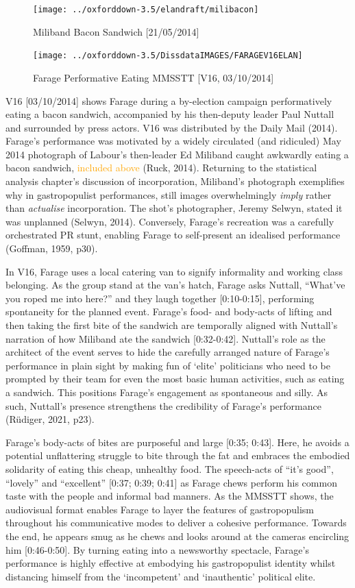 \documentclass[a4paper, nobind]{templates/ociamthesis}
\begin{document}
\begin{figure}
\texttt{[image: ../oxforddown-3.5/elandraft/milibacon]} \caption{Miliband Bacon Sandwich [21/05/2014]}\label{fig:unnamed-chunk-26}
\end{figure}

\begin{figure}
\texttt{[image: ../oxforddown-3.5/DissdataIMAGES/FARAGEV16ELAN]} \caption{Farage Performative Eating MMSSTT [V16, 03/10/2014]}\label{fig:unnamed-chunk-27}
\end{figure}

V16 {[}03/10/2014{]} shows Farage during a by-election campaign performatively eating a bacon sandwich, accompanied by his then-deputy leader Paul Nuttall and surrounded by press actors. V16 was distributed by the Daily Mail (2014). Farage's performance was motivated by a widely circulated (and ridiculed) May 2014 photograph of Labour's then-leader Ed Miliband caught awkwardly eating a bacon sandwich, \textcolor{orange}{included above} (Ruck, 2014). Returning to the statistical analysis chapter's discussion of incorporation, Miliband's photograph exemplifies why in gastropopulist performances, still images overwhelmingly \emph{imply} rather than \emph{actualise} incorporation. The shot's photographer, Jeremy Selwyn, stated it was unplanned (Selwyn, 2014). Conversely, Farage's recreation was a carefully orchestrated PR stunt, enabling Farage to self-present an idealised performance (Goffman, 1959, p30).

In V16, Farage uses a local catering van to signify informality and working class belonging. As the group stand at the van's hatch, Farage asks Nuttall, ``What've you roped me into here?'' and they laugh together {[}0:10-0:15{]}, performing spontaneity for the planned event. Farage's food- and body-acts of lifting and then taking the first bite of the sandwich are temporally aligned with Nuttall's narration of how Miliband ate the sandwich {[}0:32-0:42{]}. Nuttall's role as the architect of the event serves to hide the carefully arranged nature of Farage's performance in plain sight by making fun of `elite' politicians who need to be prompted by their team for even the most basic human activities, such as eating a sandwich. This positions Farage's engagement as spontaneous and silly. As such, Nuttall's presence strengthens the credibility of Farage's performance (Rüdiger, 2021, p23).

Farage's body-acts of bites are purposeful and large {[}0:35; 0:43{]}. Here, he avoids a potential unflattering struggle to bite through the fat and embraces the embodied solidarity of eating this cheap, unhealthy food. The speech-acts of ``it's good'', ``lovely'' and ``excellent'' {[}0:37; 0:39; 0:41{]} as Farage chews perform his common taste with the people and informal bad manners. As the MMSSTT shows, the audiovisual format enables Farage to layer the features of gastropopulism throughout his communicative modes to deliver a cohesive performance. Towards the end, he appears smug as he chews and looks around at the cameras encircling him {[}0:46-0:50{]}. By turning eating into a newsworthy spectacle, Farage's performance is highly effective at embodying his gastropopulist identity whilst distancing himself from the `incompetent' and `inauthentic' political elite.
\end{document}
